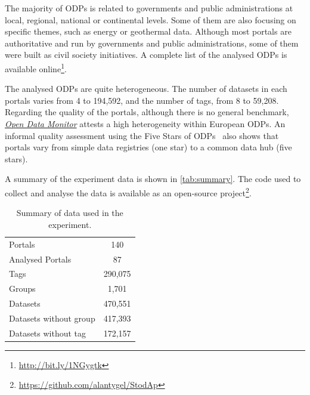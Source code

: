 The majority of ODPs is related to governments and public administrations at local, regional, national or continental levels. 
Some of them are also focusing on specific themes, such as energy or geothermal data. 
Although most portals are authoritative and run by governments and public administrations, some of them were built as civil society initiatives.
A complete list of the analysed ODPs is available online\footnote{\url{http://bit.ly/1NGygtk}}.

	
The analysed ODPs are quite heterogeneous. 
The number of datasets in each portals varies from 4 to 194,592, and the number of tags, from 8 to 59,208.
Regarding the quality of the portals, although there is no general benchmark, \emph{\href{http://opendatamonitor.eu}{Open Data Monitor}} attests a high heterogeneity within European ODPs.
An informal quality assessment using the Five Stars of ODPs~\cite{Colpaert2013} also shows that portals vary from simple data registries (one star) to a common data hub (five stars).

A summary of the experiment data is shown in \autoref{tab:summary}. 
The code used to collect and analyse the data is available as an open-source project\footnote{\url{https://github.com/alantygel/StodAp}}.

\begin{table}[]
\centering
\ABNTEXfontereduzida
\caption{Summary of data used in the experiment.}
\label{tab:summary}
\begin{tabular}{l|c}
Portals & 140 \\
Analysed Portals & 87 \\
Tags & 290,075 \\
Groups & 1,701 \\
Datasets & 470,551 \\
Datasets without group & 417,393 \\
Datasets without tag & 172,157 \\
\end{tabular}
\end{table}

